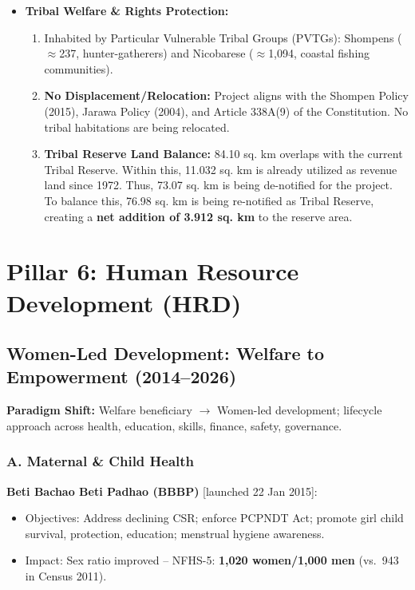 \begin{itemize}
    \item \textbf{Tribal Welfare \& Rights Protection:}
    \begin{enumerate}
        \item Inhabited by Particular Vulnerable Tribal Groups (PVTGs): Shompens ($\approx$237, hunter-gatherers) and Nicobarese ($\approx$1,094, coastal fishing communities).
        \item \textbf{No Displacement/Relocation:} Project aligns with the Shompen Policy (2015), Jarawa Policy (2004), and Article 338A(9) of the Constitution. No tribal habitations are being relocated.
        \item \textbf{Tribal Reserve Land Balance:} 84.10 sq. km overlaps with the current Tribal Reserve. Within this, 11.032 sq. km is already utilized as revenue land since 1972. Thus, 73.07 sq. km is being de-notified for the project. To balance this, 76.98 sq. km is being re-notified as Tribal Reserve, creating a \textbf{net addition of 3.912 sq. km} to the reserve area.
    \end{enumerate}
\end{itemize}

\section{Pillar 6: Human Resource Development (HRD)}

\subsection{Women-Led Development: Welfare to Empowerment (2014--2026)}

\textbf{Paradigm Shift:} Welfare beneficiary $\rightarrow$ Women-led development; lifecycle approach across health, education, skills, finance, safety, governance.

\subsubsection*{A. Maternal \& Child Health}

\textbf{Beti Bachao Beti Padhao (BBBP)} [launched 22 Jan 2015]:
\begin{itemize}
  \item Objectives: Address declining CSR; enforce PCPNDT Act; promote girl child survival, protection, education; menstrual hygiene awareness.
  \item Impact: Sex ratio improved -- NFHS-5: \textbf{1,020 women/1,000 men} (vs.\ 943 in Census 2011).
\end{itemize}

